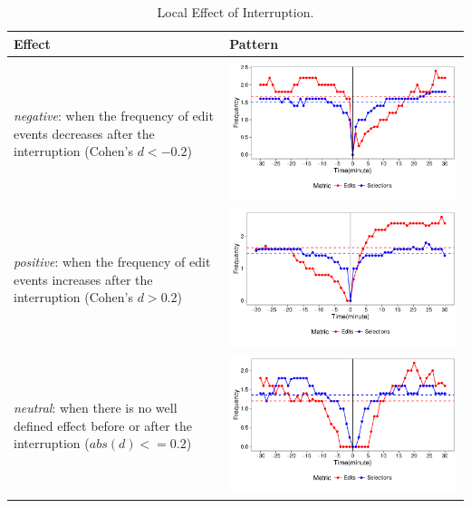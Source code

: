 \begin{table}[ht!]
	\caption{Local Effect of Interruption. }
	\label{tbl:local_effect}
	\centering
	\begin{tabular}{m{6cm} | m{5cm}}
		\hline
		Effect & Pattern \\
		\hline
		\hline \\
		\textit{negative}: when the frequency of edit events decreases after the interruption (Cohen's $d < -0.2$)
		& 
		  \multicolumn{1}{m{3cm}}{\includegraphics[scale=0.3]{Figures/UDC_local_effect_negative}} 
		      \\
		\textit{positive}: when the frequency of edit events increases after the interruption (Cohen's $d > 0.2$)
		& \multicolumn{1}{m{3cm}}{\includegraphics[scale=0.3]{Figures/UDC_local_effect_positive}} 
		\\
		\textit{neutral}: when there is no well defined effect before or after the interruption ($abs(d) <= 0.2$)
		& \multicolumn{1}{m{3cm}}{\includegraphics[scale=0.3]{Figures/UDC_local_effect_neutral}} 

\end{tabular}
\end{table}
